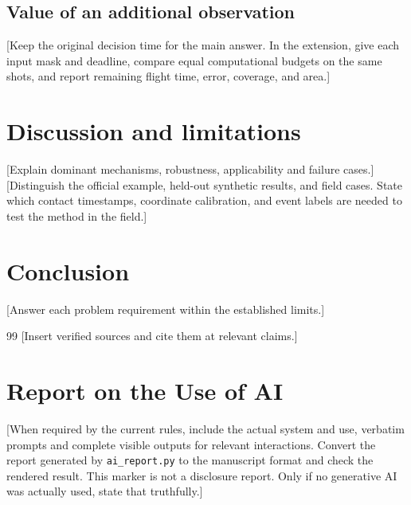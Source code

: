 \documentclass[11pt,a4paper]{article}
\begin{document}
\subsection{Value of an additional observation}
[Keep the original decision time for the main answer. In the extension,
give each input mask and deadline, compare equal computational budgets on
the same shots, and report remaining flight time, error, coverage, and area.]
\section{Discussion and limitations}
[Explain dominant mechanisms, robustness, applicability and failure cases.]
[Distinguish the official example, held-out synthetic results, and field
cases. State which contact timestamps, coordinate calibration, and event
labels are needed to test the method in the field.]
\section{Conclusion}
[Answer each problem requirement within the established limits.]
\begin{thebibliography}{99}
 [Insert verified sources and cite them at relevant claims.]
\end{thebibliography}
\clearpage
\section*{Report on the Use of AI}
[When required by the current rules, include the actual system and use,
verbatim prompts and complete visible outputs for relevant interactions.
Convert the report generated by \texttt{ai\_report.py} to the manuscript format and
check the rendered result. This marker is not a disclosure report.
Only if no generative AI was actually used, state that truthfully.]
\end{document}
